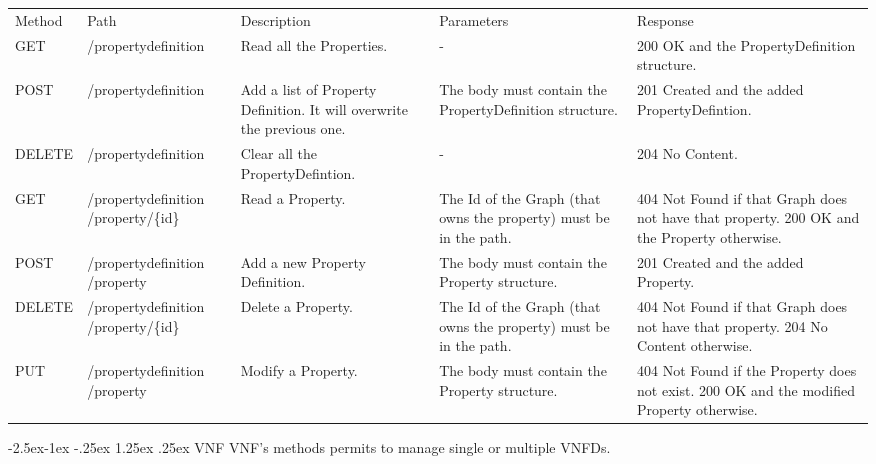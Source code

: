 \documentclass[11pt, english]{article}
\makeatletter
\renewcommand\paragraph{\@startsection{paragraph}{4}{\z@}%
            {-2.5ex\@plus -1ex \@minus -.25ex}%
            {1.25ex \@plus .25ex}%
            {\normalfont\normalsize\bfseries}}
\makeatother
\begin{document}
\begin{tabular}{ |p{2cm}|m{3cm}|p{3cm}|p{3cm}|p{4cm}| }
    \hline
    \rowcolor{black} \multicolumn{5}{|c|}{\textcolor{white}{PropertyDefinition}} \\
    \hline
    \rowcolor{Gray}
    Method & Path & Description & Parameters & Response \\
    \hline
    GET   & /propertydefinition & Read all the Properties. & - & 200 OK and the PropertyDefinition structure. \\
    \hline
    POST & /propertydefinition & Add a list of Property Definition. It will overwrite the previous one. & The body must contain the PropertyDefinition structure. & 201 Created and the added PropertyDefintion. \\
    \hline
    DELETE & /propertydefinition & Clear all the PropertyDefintion. & - & 204 No Content. \\
    \hline
    GET   & /propertydefinition /property/\{id\} & Read a Property. & The Id of the Graph (that owns the property) must be in the path. & 404 Not Found if that Graph does not have that property. 200 OK and the Property otherwise. \\
    \hline
    POST & /propertydefinition /property & Add a new Property Definition. & The body must contain the Property structure. & 201 Created and the added Property. \\
    \hline
    DELETE & /propertydefinition /property/\{id\} & Delete a Property. & The Id of the Graph (that owns the property) must be in the path. & 404 Not Found if that Graph does not have that property. 204 No Content otherwise. \\
    \hline
    PUT & /propertydefinition /property & Modify a Property. & The body must contain the Property structure. & 404 Not Found if the Property does not exist. 200 OK and the modified Property otherwise. \\
    \hline
\end{tabular}

\newpage
\paragraph{VNF}
VNF's methods permits to manage single or multiple VNFDs. \\
\end{document}
